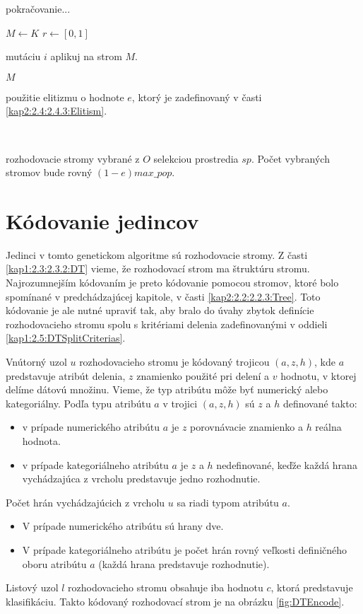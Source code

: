 \begin{algorithm}
\ContinuedFloat
\caption{pokračovanie...}
\begin{algorithmic}[1]
\State $M \gets K$
\State $r \gets [0,1]$
	\State \parbox[t]{300pt}{mutáciu $i$ aplikuj na strom $M$.}
\EndIf
\State \Return $M$
\EndFor 
\EndFunction
\\
\State \Return \parbox[t]{300pt}{použitie elitizmu o hodnote $e$, ktorý je zadefinovaný v časti \ref{kap2:2.4:2.4.3:Elitism}.}
\EndFunction
\\
\State \Return \parbox[t]{300pt}{rozhodovacie stromy vybrané z $O$ selekciou prostredia $sp$. Počet vybraných stromov bude rovný $(1-e)max\_pop$.}
\EndFunction
\end{algorithmic}
\end{algorithm}

\section{Kódovanie jedincov}\label{kap3:3.2:Encoding}
Jedinci v tomto genetickom algoritme sú rozhodovacie stromy. Z časti \ref{kap1:2.3:2.3.2:DT} vieme, že rozhodovací strom ma štruktúru stromu. Najrozumnejším kódovaním je preto kódovanie pomocou stromov, ktoré bolo spomínané v predchádzajúcej kapitole, v časti \ref{kap2:2.2:2.2.3:Tree}. Toto kódovanie je ale nutné upraviť tak, aby bralo do úvahy zbytok definície rozhodovacieho stromu spolu s kritériami delenia zadefinovanými v oddieli \ref{kap1:2.5:DTSplitCriterias}.

Vnútorný uzol $u$ rozhodovacieho stromu je kódovaný trojicou $(a,z,h)$, kde $a$ predstavuje atribút delenia, $z$ znamienko použité pri delení a $v$ hodnotu, v ktorej delíme dátovú množinu. Vieme, že typ atribútu môže byť numerický alebo kategoriálny. Podľa typu atribútu $a$ v trojici $(a,z,h)$ sú $z$ a $h$ definované takto:
\begin{itemize}
\item v prípade numerického atribútu $a$ je $z$  porovnávacie znamienko a $h$ reálna hodnota.
\item v prípade kategoriálneho atribútu $a$ je $z$ a $h$ nedefinované, keďže každá hrana vychádzajúca z vrcholu predstavuje jedno rozhodnutie.
\end{itemize}
Počet hrán vychádzajúcich z vrcholu $u$ sa riadi typom atribútu $a$.
\begin{itemize}
\item V prípade numerického atribútu sú hrany dve.
\item V prípade kategoriálneho atribútu je počet hrán rovný veľkosti definičného oboru atribútu $a$ (každá hrana predstavuje rozhodnutie).
\end{itemize}
Listový uzol $l$ rozhodovacieho stromu obsahuje iba hodnotu $c$, ktorá predstavuje klasifikáciu.
Takto kódovaný rozhodovací strom je na obrázku \ref{fig:DTEncode}.

